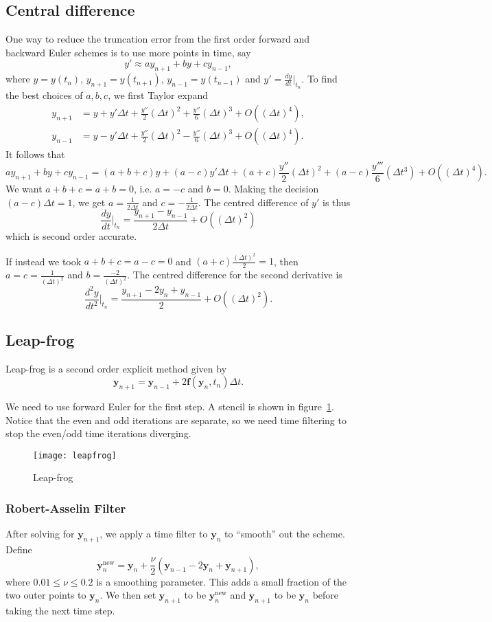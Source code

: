 \documentclass[11pt, a4paper]{article}
\theoremstyle{break}
\newcommand{\ve}{\mathbf} %
\newcommand{\dt}{\Delta t}
\newcommand{\dder}[2]{\frac{d #1}{d #2}}
\newcommand{\ddder}[3][2]{\frac{d^#1 #2}{d #3^#1}}
\newcommand{\eval}[1]{\big\rvert_{#1}}
\newcommand{\Eval}[1]{\bigg\rvert_{#1}}
\begin{document}
\subsection{Central difference}
One way to reduce the truncation error from the first order forward and backward Euler schemes is to use more points in time, say \[y'\approx a	y_{n+1}+by+cy_{n-1},\] where $y=y(t_n)$, $y_{n+1}=y(t_{n+1})$, $y_{n-1}=y(t_{n-1})$ and $y' = \dder yt\eval{t_n}$. To find the best choices of $a,b,c$, we first Taylor expand \begin{align*}
y_{n+1}&=y+y'\dt+\frac{y''}{2}(\dt)^2+\frac{y''}{6}(\dt)^3+O((\dt)^4),\\
y_{n-1}&=y-y'\dt+\frac{y''}{2}(\dt)^2-\frac{y''}{6}(\dt)^3+O((\dt)^4).
\end{align*} It follows that \[ay_{n+1}+by+cy_{n-1}=(a+b+c)y+(a-c)y'\dt+(a+c)\frac{y''}{2}(\dt)^2 +(a-c)\frac{y'''}{6}(\dt^3)+O((\dt)^4).\]
We want $a+b+c=a+b=0$, i.e. $a=-c$ and $b=0$. Making the decision $(a-c)\dt=1$, we get $a=\frac1{2\dt}$ and $c=-\frac1{2\dt}$. The centred difference of $y'$ is thus \[\dder yt\Eval{t_n}=\frac{y_{n+1}-y_{n-1}}{2\dt}+O((\dt)^2)\] which is second order accurate.

If instead we took $a+b+c=a-c=0$ and $(a+c)\frac{(\dt)^2}{2}=1$, then $a=c=\frac1{(\dt)^2}$ and $b=\frac{-2}{(\dt)^2}$. The centred difference for the second derivative is \[\ddder yt\Eval{t_n}=\frac{y_{n+1}-2y_n+y_{n-1}}{2}+O((\dt)^2).\]

\subsection{Leap-frog}
Leap-frog is a second order explicit method given by
\[\ve y_{n+1}=\ve y_{n-1}+2\ve f(\ve y_n,t_n)\dt.\]

We need to use forward Euler for the first step. A stencil is shown in figure~\ref{fig:leapFrog}. Notice that the even and odd iterations are separate, so we need time filtering to stop the even/odd time iterations diverging.



\begin{figure}\centering
	\texttt{[image: leapfrog]}
	\caption{Leap-frog}\label{fig:leapFrog}
\end{figure}

\subsubsection{Robert-Asselin Filter}
After solving for $\ve y_{n+1}$, we apply a time filter to $\ve y_n$ to ``smooth'' out the scheme. Define \[\ve y_n^{\text{new}}=\ve y_n+\frac\nu2(\ve y_{n-1}-2\ve y_n+\ve y_{n+1}),\] where $0.01\leq \nu\leq 0.2$ is a smoothing parameter. This adds a small fraction of the two outer points to $\ve y_n$. We then set $\ve y_{n+1}$ to be $\ve y_n^\text{new}$ and $\ve y_{n+1}$ to be $\ve y_n$ before taking the next time step.
\end{document}
